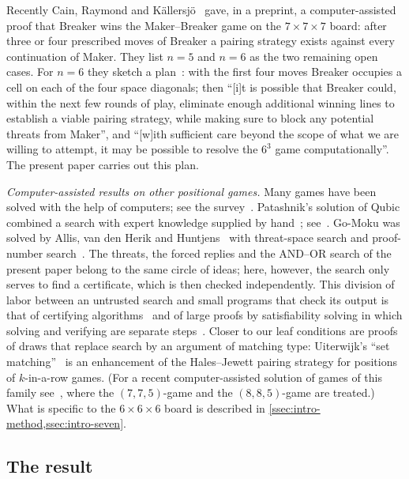 Recently Cain, Raymond and K\"allersj\"o~\cite{CainRaymondKallersjo2025} gave, in a preprint, a
computer-assisted proof that Breaker wins the Maker--Breaker game on the $7\times7\times7$ board: after
three or four prescribed moves of Breaker a pairing strategy exists against every continuation of
Maker. They list $n=5$ and $n=6$ as the two remaining open cases. For $n=6$ they sketch a
plan~\cite[Section~6.2]{CainRaymondKallersjo2025}: with the first four moves Breaker occupies a cell on
each of the four space diagonals; then ``[i]t is possible that Breaker could, within the next few
rounds of play, eliminate enough additional winning lines to establish a viable pairing strategy, while
making sure to block any potential threats from Maker'', and ``[w]ith sufficient care beyond the scope
of what we are willing to attempt, it may be possible to resolve the $6^3$ game computationally''. The
present paper carries out this plan.

\emph{Computer-assisted results on other positional games.} Many games have been solved with the help
of computers; see the survey~\cite{vandenHerikUiterwijkvanRijswijck2002}. Patashnik's solution of Qubic
combined a search with expert knowledge supplied by hand~\cite{Patashnik1980}; see~\cite[pp.~95--96]{Allis1994}.
Go-Moku was solved by Allis, van den Herik and Huntjens~\cite{AllisvandenHerikHuntjens1996} with
threat-space search and proof-number search~\cite{AllisvanderMeulenvandenHerik1994}. The threats, the
forced replies and the AND--OR search of the present paper belong to the same circle of ideas; here,
however, the search only serves to find a certificate, which is then checked independently. This
division of labor between an untrusted search and small programs that check its output is that of
certifying algorithms~\cite{McConnellEtAl2011} and of large proofs by satisfiability solving in which
solving and verifying are separate steps~\cite{HeuleKullmannMarek2016}. Closer to
our leaf conditions are proofs of draws that replace search by an argument of matching type:
Uiterwijk's ``set matching''~\cite{Uiterwijk2019} is an enhancement of the Hales--Jewett pairing
strategy for positions of $k$-in-a-row games. (For a recent computer-assisted solution of games of
this family see~\cite{HsuEtAl2020}, where the $(7,7,5)$-game and the $(8,8,5)$-game are treated.) What
is specific to the $6\times6\times6$ board is described in \cref{ssec:intro-method,ssec:intro-seven}.

\subsection{The result}\label{ssec:intro-result}

